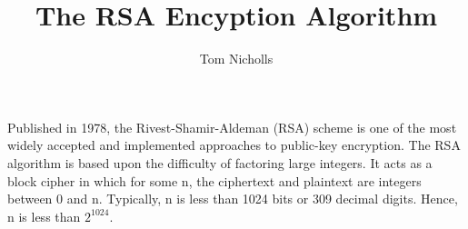 \documentclass[a4paper,11pt]{article}
\title{The RSA Encyption Algorithm}
\author{Tom Nicholls}
\begin{document}
\maketitle

Published in 1978, the Rivest-Shamir-Aldeman (RSA) scheme is one of the most widely accepted and implemented approaches to public-key encryption. The RSA algorithm is based upon the difficulty of factoring large integers. It acts as a block cipher in which for some n, the ciphertext and plaintext are integers between 0 and n. Typically, n is less than 1024 bits or 309 decimal digits. Hence, n is less than $2^{1024}$.
\end{document}
